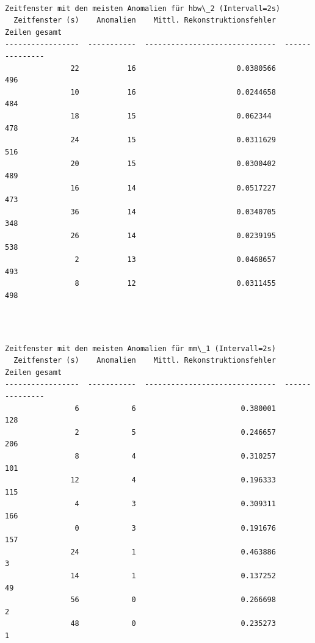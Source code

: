 \documentclass[11pt]{article}
\begin{document}
    \begin{Verbatim}[commandchars=\\\{\}]

Zeitfenster mit den meisten Anomalien für hbw\_2 (Intervall=2s)
  Zeitfenster (s)    Anomalien    Mittl. Rekonstruktionsfehler    Zeilen gesamt
-----------------  -----------  ------------------------------  ---------------
               22           16                       0.0380566              496
               10           16                       0.0244658              484
               18           15                       0.062344               478
               24           15                       0.0311629              516
               20           15                       0.0300402              489
               16           14                       0.0517227              473
               36           14                       0.0340705              348
               26           14                       0.0239195              538
                2           13                       0.0468657              493
                8           12                       0.0311455              498
    \end{Verbatim}

    \begin{center}
    \end{center}
    { \hspace*{\fill} \\}
    
    \begin{Verbatim}[commandchars=\\\{\}]

Zeitfenster mit den meisten Anomalien für mm\_1 (Intervall=2s)
  Zeitfenster (s)    Anomalien    Mittl. Rekonstruktionsfehler    Zeilen gesamt
-----------------  -----------  ------------------------------  ---------------
                6            6                        0.380001              128
                2            5                        0.246657              206
                8            4                        0.310257              101
               12            4                        0.196333              115
                4            3                        0.309311              166
                0            3                        0.191676              157
               24            1                        0.463886                3
               14            1                        0.137252               49
               56            0                        0.266698                2
               48            0                        0.235273                1
    \end{Verbatim}
\end{document}
